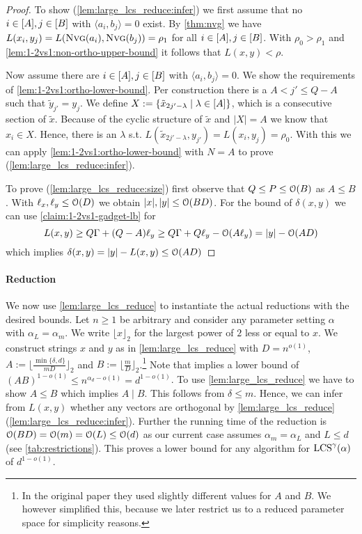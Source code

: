 \begin{proof}
To show (\ref{lem:large_lcs_reduce:infer}) we first assume that no $i \in [A], j \in [B]$ with $\langle a_i, b_j \rangle = 0$ exist.
By \autoref{thm:nvg} we have $L(x_i, y_j) = L(\text{\textsc{Nvg}}(a_i), \text{\textsc{Nvg}}(b_j)) = \rho_1$ for all $i \in [A], j \in [B]$.
With $\rho_0 > \rho_1$ and \autoref{lem:1-2vs1:non-ortho-upper-bound} it follows that $L(x,y) < \rho$.

Now assume there are $i \in [A], j \in [B]$ with $\langle a_i, b_j \rangle = 0$.
We show the requirements of \autoref{lem:1-2vs1:ortho-lower-bound}.
Per construction there is a $A < j' \leq Q - A$ such that $\tilde{y}_{j'} = y_j$.
We define $X := \{\tilde{x}_{2j' - \lambda} \mid \lambda \in [A]\}$, which is a consecutive section of $\tilde{x}$.
Because of the cyclic structure of $\tilde{x}$ and $|X| = A$ we know that $x_i \in X$.
Hence, there is an $\lambda$ s.t. $L(\tilde{x}_{2j' - \lambda}, y_{j'}) = L(x_i, y_j) = \rho_0$.
With this we can apply \autoref{lem:1-2vs1:ortho-lower-bound} with $N = A$ to prove (\ref{lem:large_lcs_reduce:infer}).

To prove (\ref{lem:large_lcs_reduce:size}) first observe that $Q \leq P \leq \mathcal{O}(B)$ as $A \leq B$. With $\ell_x, \ell_y \leq \mathcal{O}(D)$ we obtain $|x|,|y| \leq \mathcal{O}(BD)$.
For the bound of $\delta(x,y)$ we can use \autoref{claim:1-2vs1-gadget-lb} for
\[
L(x,y) \geq Q\Gamma + (Q - A)\ell_y \geq Q\Gamma + Q\ell_y - \mathcal{O}(A\ell_y) = |y| - \mathcal{O}(AD)
\]
which implies $\delta(x,y) = |y| - L(x,y) \leq \mathcal{O}(AD)$
\end{proof}



\paragraph*{Reduction}
We now use \autoref{lem:large_lcs_reduce} to instantiate the actual reductions with the desired bounds.
Let $n \geq 1$ be arbitrary and consider any parameter setting $\alpha$ with $\alpha_L = \alpha_m$.
We write $\lfloor x \rfloor_2$ for the largest power of $2$ less or equal to $x$.
We construct strings $x$ and $y$ as in \autoref{lem:large_lcs_reduce} with $D = n^{o(1)}$, $A := \lfloor \frac{\min\{\delta, d\}}{mD} \rfloor_2$ and $B := \lfloor \frac{m}{D} \rfloor_2$.\footnote{In the original paper they used slightly different values for $A$ and $B$. We however simplified this, because we later restrict us to a reduced parameter space for simplicity reasons.}
Note that \uovh{} implies a lower bound of $(AB)^{1-o(1)} \leq n^{\alpha_d - o(1)} = d^{1 - o(1)}$.
To use \autoref{lem:large_lcs_reduce} we have to show $A \leq B$ which implies $A \mid B$.
This follows from $\delta \leq m$.
Hence, we can infer from $L(x,y)$ whether any vectors are orthogonal by \autoref{lem:large_lcs_reduce} (\ref{lem:large_lcs_reduce:infer}).
Further the running time of the reduction is $\mathcal{O}(BD) = \mathcal{O}(m) = \mathcal{O}(L) \leq \mathcal{O}(d)$ as our current case assumes $\alpha_m = \alpha_L$ and $L \leq d$ (see \autoref{tab:restrictions}).
This proves a lower bound for any algorithm for $\text{LCS}^\gamma(\mathbb{\alpha})$ of $d^{1-o(1)}$.


